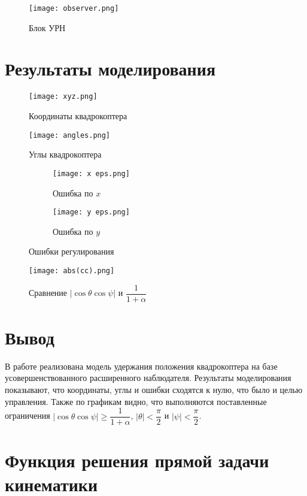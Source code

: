 \documentclass[14pt]{extarticle}
\begin{document}
    \begin{figure}[H]
        \centering
        \texttt{[image: observer.png]}
        \caption{Блок УРН}
        \label{pic:observer}
    \end{figure}

    \section*{Результаты моделирования}

    \begin{figure}[H]
        \centering
        \texttt{[image: xyz.png]}
        \caption{Координаты квадрокоптера}
        \label{pic:xyz}
    \end{figure}

    \begin{figure}[H]
        \centering
        \texttt{[image: angles.png]}
        \caption{Углы квадрокоптера}
        \label{pic:angles}
    \end{figure}

    \begin{figure}[H]
        \centering
        \begin{subfigure}{0.49\textwidth}
            \texttt{[image: x eps.png]}
            \caption{Ошибка по $x$}
        \end{subfigure}
        \begin{subfigure}{0.49\textwidth}
            \texttt{[image: y eps.png]}
            \caption{Ошибка по $y$}
        \end{subfigure}
        \caption{Ошибки регулирования}
        \label{pic:eps}
    \end{figure}

    \begin{figure}[H]
        \centering
        \texttt{[image: abs(cc).png]}
        \caption{Сравнение $\left| \cos\theta\cos\psi \right|$ и $\dfrac{1}{1+\alpha}$}
        \label{pic:abs(cc)}
    \end{figure}


    \section*{Вывод}
    В работе реализована модель удержания положения квадрокоптера на базе усовершенствованного расширенного наблюдателя.
    Результаты моделирования показывают, что координаты, углы и ошибки сходятся к нулю, что было и целью управления.
    Также по графикам видно, что выполняются поставленные ограничения $\left| \cos\theta\cos\psi \right| \ge \dfrac{1}{1+\alpha}$,
    $\left| \theta \right| < \dfrac{\pi}{2}$ и $\left| \psi \right| < \dfrac{\pi}{2}$.

    \appendix \newpage
    \renewcommand{\thesection}{\Asbuk{section}}
    \section{Функция решения прямой задачи кинематики}\label{code:given}
\end{document}
